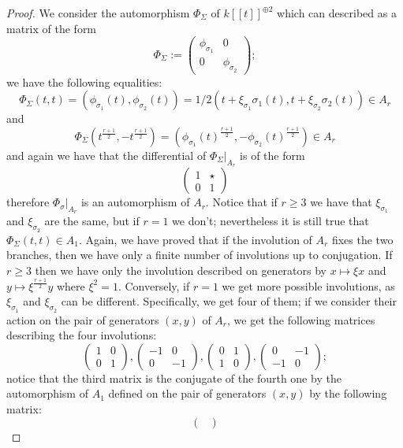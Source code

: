 \documentclass{alggeom}
\numberwithin{equation}{section}
\numberwithin{subsection}{section}
\theoremstyle{definition}
\theoremstyle{remark}
\begin{document}
\begin{proof}
 We consider the automorphism $\Phi_{\Sigma}$ of $k[[t]]^{\oplus 2}$ which can described as a matrix of the form
$$
\Phi_{\Sigma}:=
\begin{pmatrix}
\phi_{\sigma_1} & 0 \\ 0 & \phi_{\sigma_2}
\end{pmatrix};
$$
 we have the following equalities:
$$
\Phi_{\Sigma}(t,t)=(\phi_{\sigma_1}(t),\phi_{\sigma_2}(t))=1/2(t+\xi_{\sigma_1}\sigma_1(t),t+\xi_{\sigma_2}\sigma_2(t)) \in A_r
$$ 
and 
$$
\Phi_{\Sigma}(t^{\frac{r+1}{2}},-t^{\frac{r+1}{2}})=
(\phi_{\sigma_1}(t)^{\frac{r+1}{2}},-\phi_{\sigma_2}(t)^{\frac{r+1}{2}}) \in A_r
$$
 and again we have that the differential of $\Phi_{\Sigma}\vert_{A_r}$ is of the form
$$
\begin{pmatrix}
1  &  \star \\
0  &    1
\end{pmatrix} 
$$ 
therefore $\Phi_{\sigma}\vert_{A_r}$ is an automorphism of $A_r$. Notice that if $r\geq 3$ we have that $\xi_{\sigma_1}$ and $\xi_{\sigma_2}$ are the same, but if $r=1$ we don't; nevertheless it is still true that $\Phi_{\Sigma}(t,t) \in A_1$. 
Again, we have proved that if the involution of $A_r$ fixes the two branches, then we have only a finite number of involutions up to conjugation. If $r\geq 3$ then we have only the involution described on generators by $x\mapsto \xi x$ and $y\mapsto \xi^{\frac{r+1}{2}} y$ where $\xi^2=1$. Conversely, if $r=1$ we get more possible involutions, as $\xi_{\sigma_1}$ and $\xi_{\sigma_2}$ can be different. Specifically, we get four of them; if we consider their action on the pair of generators $(x,y)$ of $A_r$, we get the following matrices describing the four involutions:
$$
\begin{pmatrix}
1  &  0 \\
0  &    1
\end{pmatrix} ,
\begin{pmatrix}
	-1  &  0 \\
	0  &   -1
\end{pmatrix},
\begin{pmatrix}
0  &  1 \\
1  &  0
\end{pmatrix},
\begin{pmatrix}
	0  &  -1 \\
	-1  &  0
\end{pmatrix};
$$
notice that the third matrix is the conjugate of the fourth one by the automorphism of $A_1$ defined on the pair of generators $(x,y)$ by the following matrix:
$$
\begin{pmatrix}

\end{pmatrix}$$
\end{proof}
\end{document}
